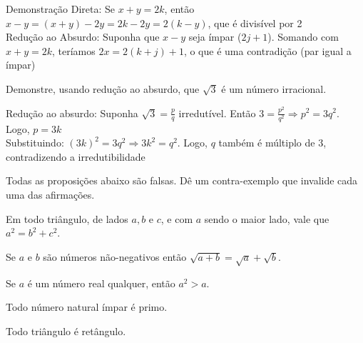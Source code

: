 \begin{exercises*}
\begin{exercise}
\begin{answer}
\begin{alphalist}
        \item
            Demonstração Direta:
            Se $x + y = 2k$, então $x - y = (x + y) - 2y = 2k - 2y = 2(k - y)$,
            que é divisível por 2 \\
            Redução ao Absurdo:
            Suponha que $x - y$ seja ímpar ($2j+1$).
            Somando com $x+y=2k$, teríamos $2x = 2(k+j)+1$,
            o que é uma contradição (par igual a ímpar)
    \end{alphalist}
  \end{answer}
\end{exercise}


\begin{exercise}
  Demonstre, usando redução ao absurdo, que $\sqrt{3}$ é um número
  irracional.

  \begin{answer}
    Redução ao absurdo: Suponha $\sqrt{3} = \frac{p}{q}$ irredutível.
    Então $3 = \frac{p^2}{q^2} \Rightarrow p^2 = 3q^2$.
    Logo, $p = 3k$ \\
    Substituindo: $(3k)^2 = 3q^2 \Rightarrow 3k^2 = q^2$.
    Logo, $q$ também é múltiplo de 3, contradizendo a irredutibilidade
  \end{answer}
\end{exercise}


\begin{exercise}
  Todas as proposições abaixo são falsas. Dê um contra-exemplo que
  invalide cada uma das afirmações.
  \begin{alphalist}
    \item Em todo triângulo, de lados $a,b$ e $c$, e com $a$ sendo o maior
      lado, vale que $a^2=b^2+c^2$.
    \item Se $a$ e $b$ são números não-negativos então $\sqrt{a+b}=
      \sqrt{a}+ \sqrt{b}$.
    \item Se $a$ é um número real qualquer, então $a^2>a$.
    \item Todo número natural ímpar é primo.
    \item Todo triângulo é retângulo.
  \end{alphalist}


\end{exercise}
\end{exercises*}
